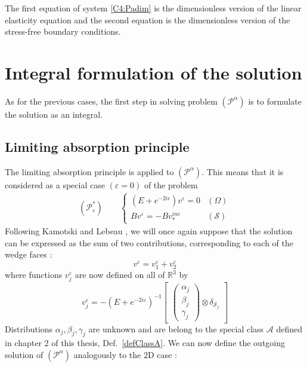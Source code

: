  The first equation of system \eqref{C4:Padim} is the dimensionless version of the linear elasticity equation and the second equation is the dimensionless version of the stress-free boundary conditions.

\section{Integral formulation of the solution}
As for the previous cases, the first step in solving problem $(\mathcal{P}^{\alpha})$ is to formulate the solution as an integral. 
\subsection{Limiting absorption principle}
The limiting absorption principle is applied to $(\mathcal{P}^{\alpha})$. This means that it is considered as a special case $(\varepsilon=0)$ of the problem
\begin{eqnarray}
(\mathcal{P}^*_{\varepsilon}) \hspace{2em} \left\{
\begin{array}{lr}
(E+e^{-2i\epsilon})v^{\varepsilon}=0 & (\Omega) \\
Bv^{\varepsilon}=-Bv_*^{inc} & (\mathcal{S})
\end{array}
\right.
\label{C4:Pabs}
\end{eqnarray}
Following Kamotski and Lebeau \cite{KamotskiLebeau}, we will once again suppose that the solution can be expressed as the sum of two contributions, corresponding to each of the wedge faces :
\begin{equation}
v^{\varepsilon}=v_1^{\varepsilon}+v_2^{\varepsilon}
\label{C4:v1+v2}
\end{equation}
where functions $v_j^{\varepsilon}$ are now defined on all of  $\mathbb{R}^3$ by
\begin{equation}
v_j^{\varepsilon}=-(E+e^{-2i\varepsilon})^{-1} \begin{bmatrix}
\begin{pmatrix}
\alpha_j \\
\beta_j \\
\gamma_j
\end{pmatrix}
\otimes \delta_{\mathcal{S}_j}
\end{bmatrix}
\label{C4:vjdef}
\end{equation}
Distributions $\alpha_j,\beta_j, \gamma_j $ are unknown and are belong to the special class $\mathcal{A}$ defined in chapter 2 of this thesis, Def.~\ref{defClassA}. We can now define the outgoing solution of $(\mathcal{P}^{\alpha})$ analogously to the 2D case :
